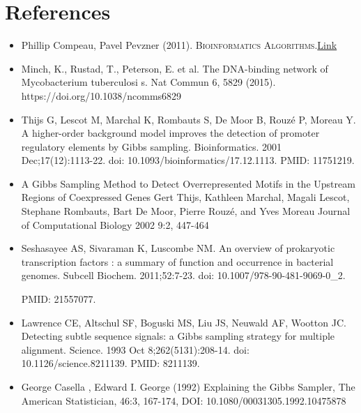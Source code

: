 \documentclass[12pt]{scrartcl} %
\begin{document}
\section{References}
\begin{itemize}
    \item Phillip Compeau, Pavel Pevzner (2011). \textsc{
        Bioinformatics Algorithms}.\href{https://www.bioinformaticsalgorithms.org}{Link}
    \item Minch, K., Rustad, T., Peterson, E. et al. The DNA-binding network of Mycobacterium tuberculosi s. Nat Commun 6, 5829 (2015). https://doi.org/10.1038/ncomms6829
    \item Thijs G, Lescot M, Marchal K, Rombauts S, De Moor B, Rouzé P, Moreau Y. A higher-order background model improves the detection of promoter regulatory elements by Gibbs sampling. Bioinformatics. 2001 Dec;17(12):1113-22. doi: 10.1093/bioinformatics/17.12.1113. PMID: 11751219.
    \item A Gibbs Sampling Method to Detect Overrepresented Motifs in the Upstream Regions of Coexpressed Genes
    Gert Thijs, Kathleen Marchal, Magali Lescot, Stephane Rombauts, Bart De Moor, Pierre Rouzé, and Yves Moreau
    Journal of Computational Biology 2002 9:2, 447-464
    \item Seshasayee AS, Sivaraman K, Luscombe NM. An overview of prokaryotic transcription factors : a summary of function and occurrence in bacterial genomes. Subcell Biochem. 2011;52:7-23. doi: 10.1007/978-90-481-9069-0\_2. 
    
    PMID: 21557077.
    
    \item Lawrence CE, Altschul SF, Boguski MS, Liu JS, Neuwald AF, Wootton JC. Detecting subtle sequence signals: a Gibbs sampling strategy for multiple alignment. Science. 1993 Oct 8;262(5131):208-14. doi: 10.1126/science.8211139. PMID: 8211139.
    
    \item George Casella ,  Edward I. George (1992) Explaining the Gibbs Sampler, The
    American Statistician, 46:3, 167-174, DOI: 10.1080/00031305.1992.10475878
\end{itemize}
\end{document}
